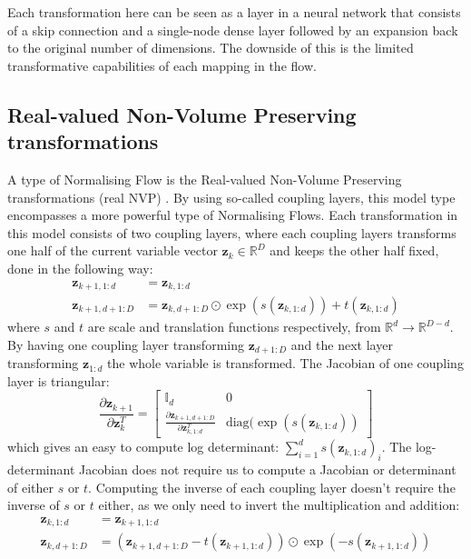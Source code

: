 \documentclass{report}
\newcommand{\bz}{\mathbf{z}}
\newcommand{\parfrac}[2]{\frac{\partial #1}{\partial#2}}
\begin{document}
Each transformation here can be seen as a layer in a neural network that consists of a skip connection and a single-node dense layer followed by an expansion back to the original number of dimensions. The downside of this is the limited transformative capabilities of each mapping in the flow.

\subsection{Real-valued Non-Volume Preserving transformations}
A type of Normalising Flow is the Real-valued Non-Volume Preserving transformations (real NVP) \cite{dinh2016density}. By using so-called coupling layers, this model type encompasses a more powerful type of Normalising Flows. Each transformation in this model consists of two coupling layers, where each coupling layers transforms one half of the current variable vector $\bz_k \in \mathbb{R}^D$ and keeps the other half fixed, done in the following way:
\begin{align}\label{equation:real_nvp_coupling}
    \bz_{k+1, 1:d} &= \bz_{k, 1:d} \\
    \bz_{k+1, d+1:D} &= \bz_{k, d+1:D} \odot \exp \left(s(\bz_{k, 1:d}) \right) + t(\bz_{k, 1:d})
\end{align}
where $s$ and $t$ are scale and translation functions respectively, from $\mathbb{R}^{d} \rightarrow \mathbb{R}^{D-d}$. By having one coupling layer transforming $\bz_{d+1:D}$ and the next layer transforming $\bz_{1:d}$ the whole variable is transformed. The Jacobian of one coupling layer is triangular:
\begin{equation}
    \parfrac{\bz_{k+1}}{\bz_k^T} = \begin{bmatrix}
    \mathbb{I}_d & 0\\
    \parfrac{\bz_{k+1, d+1:D}}{\bz_{k, 1:d}^T} & \text{diag}(\exp(s(\bz_{k, 1:d}))
    \end{bmatrix}
\end{equation}
which gives an easy to compute log determinant: $\sum\limits^d_{i=1} s(\bz_{k, 1:d})_i$. The log-determinant Jacobian  does not require us to compute a Jacobian or determinant of either $s$ or $t$. Computing the inverse of each coupling layer doesn't require the inverse of $s$ or $t$ either, as we only need to invert the multiplication and addition:
\begin{align}\label{equation:real_nvp_coupling_inverse}
    \bz_{k, 1:d} &= \bz_{k+1, 1:d} \\
    \bz_{k, d+1:D} &= (\bz_{k+1, d+1:D} - t(\bz_{k+1, 1:d})) \odot \exp \left(- s(\bz_{k+1, 1:d}) \right) 
\end{align}
\end{document}
